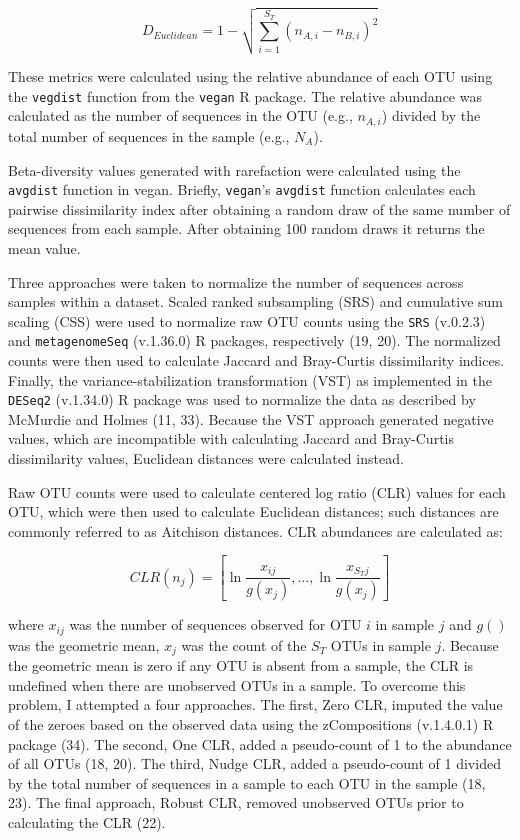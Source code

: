 \documentclass[
]{article}
\begin{document}
\[D_{Euclidean}=1-\sqrt{\sum_{i=1}^{S_T}\left(n_{A,i} - n_{B,i}\right)^2}\]

These metrics were calculated using the relative abundance of each OTU
using the \texttt{vegdist} function from the \texttt{vegan} R package.
The relative abundance was calculated as the number of sequences in the
OTU (e.g., \(n_{A,i}\)) divided by the total number of sequences in the
sample (e.g., \(N_A\)).

Beta-diversity values generated with rarefaction were calculated using
the \texttt{avgdist} function in vegan. Briefly, \texttt{vegan}'s
\texttt{avgdist} function calculates each pairwise dissimilarity index
after obtaining a random draw of the same number of sequences from each
sample. After obtaining 100 random draws it returns the mean value.

Three approaches were taken to normalize the number of sequences across
samples within a dataset. Scaled ranked subsampling (SRS) and cumulative
sum scaling (CSS) were used to normalize raw OTU counts using the
\texttt{SRS} (v.0.2.3) and \texttt{metagenomeSeq} (v.1.36.0) R packages,
respectively (19, 20). The normalized counts were then used to calculate
Jaccard and Bray-Curtis dissimilarity indices. Finally, the
variance-stabilization transformation (VST) as implemented in the
\texttt{DESeq2} (v.1.34.0) R package was used to normalize the data as
described by McMurdie and Holmes (11, 33). Because the VST approach
generated negative values, which are incompatible with calculating
Jaccard and Bray-Curtis dissimilarity values, Euclidean distances were
calculated instead.

Raw OTU counts were used to calculate centered log ratio (CLR) values
for each OTU, which were then used to calculate Euclidean distances;
such distances are commonly referred to as Aitchison distances. CLR
abundances are calculated as:

\[
CLR\left(n_j\right) = \left[ \ln\frac{x_{ij}}{g(x_j)}, ..., \ln\frac{x_{S_Tj}}{g(x_j)}\right]
\]

where \(x_{ij}\) was the number of sequences observed for OTU \(i\) in
sample \(j\) and \(g()\) was the geometric mean, \(x_j\) was the count
of the \(S_T\) OTUs in sample \(j\). Because the geometric mean is zero
if any OTU is absent from a sample, the CLR is undefined when there are
unobserved OTUs in a sample. To overcome this problem, I attempted a
four approaches. The first, Zero CLR, imputed the value of the zeroes
based on the observed data using the zCompositions (v.1.4.0.1) R package
(34). The second, One CLR, added a pseudo-count of 1 to the abundance of
all OTUs (18, 20). The third, Nudge CLR, added a pseudo-count of 1
divided by the total number of sequences in a sample to each OTU in the
sample (18, 23). The final approach, Robust CLR, removed unobserved OTUs
prior to calculating the CLR (22).
\end{document}
